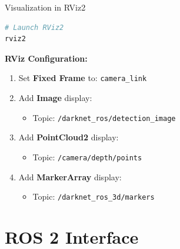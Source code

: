 \documentclass[aspectratio=169]{beamer}
\begin{document}
\begin{frame}[fragile]{Visualization in RViz2}
\begin{lstlisting}[language=bash]
# Launch RViz2
rviz2
\end{lstlisting}

\vspace{1em}
\textbf{RViz Configuration:}
\begin{enumerate}
    \item Set \textbf{Fixed Frame} to: \texttt{camera\_link}
    \item Add \textbf{Image} display:
    \begin{itemize}
        \item Topic: \texttt{/darknet\_ros/detection\_image}
    \end{itemize}
    \item Add \textbf{PointCloud2} display:
    \begin{itemize}
        \item Topic: \texttt{/camera/depth/points}
    \end{itemize}
    \item Add \textbf{MarkerArray} display:
    \begin{itemize}
        \item Topic: \texttt{/darknet\_ros\_3d/markers}
    \end{itemize}
\end{enumerate}
\end{frame}

\section{ROS 2 Interface}
\end{document}
